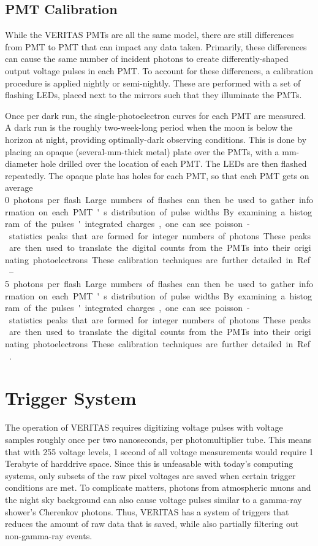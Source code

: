 \subsection{PMT Calibration}

While the VERITAS PMTs are all the same model, there are still differences from PMT to PMT that can impact any data taken.
Primarily, these differences can cause the same number of incident photons to create differently-shaped output voltage pulses in each PMT.
To account for these differences, a calibration procedure is applied nightly or semi-nightly.
These are performed with a set of flashing LEDs, placed next to the mirrors such that they illuminate the PMTs.

Once per dark run, the single-photoelectron curves for each PMT are measured.
A dark run is the roughly two-week-long period when the moon is below the horizon at night, providing optimally-dark observing conditions.
This is done by placing an opaque (several-mm-thick metal) plate over the PMTs, with a mm-diameter hole drilled over the location of each PMT.
The LEDs are then flashed repeatedly.
The opaque plate has holes for each PMT, so that each PMT gets on average \SIrange{0}{5} photons per flash.
Large numbers of flashes can then be used to gather information on each PMT's distribution of pulse widths.
By examining a histogram of the pulses' integrated charges, one can see poisson-statistics peaks that are formed for integer numbers of photons.
These peaks are then used to translate the digital counts from the PMTs into their originating photoelectrons.
These calibration techniques are further detailed in Ref.~\cite{calib_techniques}.


\section{Trigger System}\label{sec:trig}

The operation of VERITAS requires digitizing voltage pulses with voltage samples roughly once per two nanoseconds, per photomultiplier tube.
This means that with 255 voltage levels, 1 second of all voltage measurements would require 1 Terabyte of harddrive space.
Since this is unfeasable with today's computing systems, only subsets of the raw pixel voltages are saved when certain trigger conditions are met.
To complicate matters, photons from atmospheric muons and the night sky background can also cause voltage pulses similar to a gamma-ray shower's Cherenkov photons.
Thus, VERITAS has a system of triggers that reduces the amount of raw data that is saved, while also partially filtering out non-gamma-ray events.

